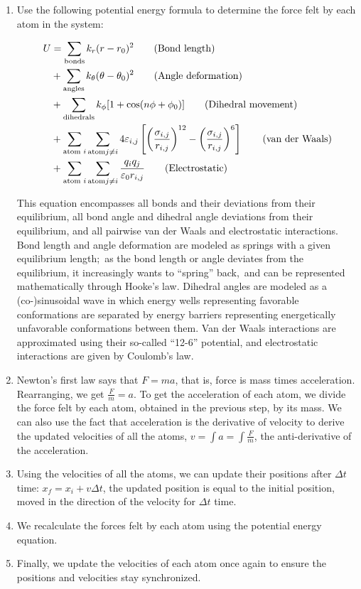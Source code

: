 \begin{enumerate}
\item Use the following potential energy formula to determine the force felt by each atom in the system:

\begin{align}
    U &= \sum_{\text{bonds}} k_{r}(r-r_{0})^{2} \tag{\text{Bond length}} \\
    &+ \sum_{\text{angles}} k_{\theta}(\theta - \theta_0)^{2} \tag{\text{Angle deformation}} \\
    & + \sum_{\text{dihedrals}} k_{\phi}[1+\cos(n\phi+\phi_0)] \tag{\text{Dihedral movement}} \\
    &+ \sum_{\text{atom }i}\sum_{\text{atom} j\neq i} 4\varepsilon_{i,j}\left[\left(\frac{\sigma_{i,j}}{r_{i,j}}\right)^{12} - \left(\frac{\sigma_{i,j}}{r_{i,j}}\right)^{6}\right] \tag{\text{van der Waals}} \\
	&+ \sum_{\text{atom }i}\sum_{\text{atom} j\neq i} \frac{q_{i}q_{j}}{\varepsilon_{0}r_{i,j}} \tag{\text{Electrostatic}}
\end{align}

This equation encompasses all bonds and their deviations from their equilibrium, all bond angle and dihedral angle deviations from their equilibrium, and all pairwise van der Waals and electrostatic interactions. Bond length and angle deformation are modeled as springs with a given equilibrium length; as the bond length or angle deviates from the equilibrium, it increasingly wants to ``spring'' back, and can be represented mathematically through Hooke's law. Dihedral angles are modeled as a (co-)sinusoidal wave in which energy wells representing favorable conformations are separated by energy barriers representing energetically unfavorable conformations between them. Van der Waals interactions are approximated using their so-called ``12-6'' potential, and electrostatic interactions are given by Coulomb's law.

\item Newton's first law says that \(F=ma\), that is, force is mass times acceleration. Rearranging, we get \(\frac{F}{m} = a\). To get the acceleration of each atom, we divide the force felt by each atom, obtained in the previous step, by its mass. We can also use the fact that acceleration is the derivative of velocity to derive the updated velocities of all the atoms, \(v = \int a = \int\frac{F}{m}\), the anti-derivative of the acceleration.

\item Using the velocities of all the atoms, we can update their positions after \(\Delta t\) time: \(x_{f} = x_{i} + v\Delta t\), the updated position is equal to the initial position, moved in the direction of the velocity for \(\Delta t\) time.

\item We recalculate the forces felt by each atom using the potential energy equation.

\item Finally, we update the velocities of each atom once again to ensure the positions and velocities stay synchronized.

\end{enumerate}

